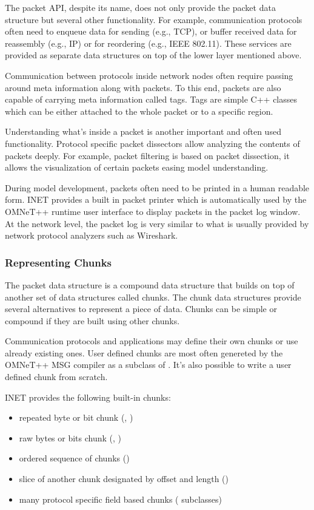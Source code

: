 The packet API, despite its name, does not only provide the packet data
structure but several other functionality. For example, communication
protocols often need to enqueue data for sending (e.g., TCP), or buffer
received data for reassembly (e.g., IP) or for reordering (e.g., IEEE
802.11). These services are provided as separate data structures on top of
the lower layer mentioned above.

Communication between protocols inside network nodes often require passing
around meta information along with packets. To this end, packets are also
capable of carrying meta information called tags. Tags are simple C++
classes which can be either attached to the whole packet or to a specific
region.

Understanding what's inside a packet is another important and often used
functionality. Protocol specific packet dissectors allow analyzing the
contents of packets deeply. For example, packet filtering is based on
packet dissection, it allows the visualization of certain packets easing
model understanding.

During model development, packets often need to be printed in a human
readable form. INET provides a built in packet printer which is
automatically used by the OMNeT++ runtime user interface to display packets
in the packet log window. At the network level, the packet log is very
similar to what is usually provided by network protocol analyzers such as
Wireshark.

\subsubsection*{Representing Chunks}

The packet data structure is a compound data structure that builds on top
of another set of data structures called chunks. The chunk data structures
provide several alternatives to represent a piece of data. Chunks can be
simple or compound if they are built using other chunks.

Communication protocols and applications may define their own chunks or use
already existing ones. User defined chunks are most often genereted by the
OMNeT++ MSG compiler as a subclass of . It's also
possible to write a user defined chunk from scratch.

INET provides the following built-in chunks:

\begin{itemize}
    \item   repeated byte or bit chunk (, )
    \item   raw bytes or bits chunk (, )
    \item   ordered sequence of chunks ()
    \item   slice of another chunk designated by offset and length ()
    \item   many protocol specific field based chunks ( subclasses)
\end{itemize}

